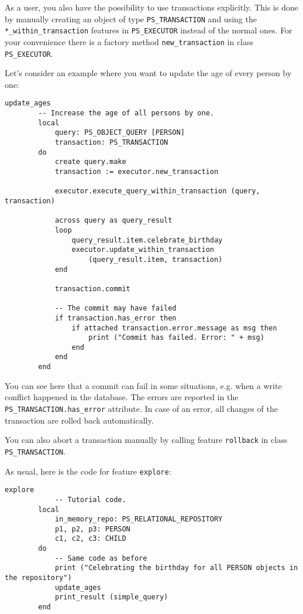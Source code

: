 \documentclass[a4paper,12pt]{report}
\begin{document}
As a user, you also have the possibility to use transactions explicitly. 
This is done by manually creating an object of type \lstinline!PS_TRANSACTION! and using the \lstinline!*_within_transaction! features in \lstinline!PS_EXECUTOR! instead of the normal ones.
For your convenience there is a factory method \lstinline{new_transaction} in class \lstinline!PS_EXECUTOR!.

Let's consider an example where you want to update the age of every person by one:

\begin{lstlisting}[language=OOSC2Eiffel, captionpos=b, caption={}, label={lst:update_all_ages}]
	update_ages
		-- Increase the age of all persons by one.
		local
			query: PS_OBJECT_QUERY [PERSON]
			transaction: PS_TRANSACTION
		do
			create query.make
			transaction := executor.new_transaction

			executor.execute_query_within_transaction (query, transaction)

			across query as query_result
			loop
				query_result.item.celebrate_birthday
				executor.update_within_transaction 
					(query_result.item, transaction)
			end

			transaction.commit

			-- The commit may have failed
			if transaction.has_error then
				if attached transaction.error.message as msg then
					print ("Commit has failed. Error: " + msg)
				end
			end
		end
\end{lstlisting}

You can see here that a commit can fail in some situations, e.g. when a write conflict happened in the database.
The errors are reported in the \lstinline!PS_TRANSACTION.has_error! attribute.
In case of an error, all changes of the transaction are rolled back automatically.

You can also abort a transaction manually by calling feature \lstinline{rollback} in class \lstinline{PS_TRANSACTION}.

As usual, here is the code for feature \lstinline{explore}:
\begin{lstlisting}[language=OOSC2Eiffel, captionpos=b, caption={Testing an update with explicit transaction.}, label={lst:explicit_transactions_update}]
	explore
			-- Tutorial code.
		local
			in_memory_repo: PS_RELATIONAL_REPOSITORY
			p1, p2, p3: PERSON
			c1, c2, c3: CHILD
		do
			-- Same code as before
			print ("Celebrating the birthday for all PERSON objects in the repository")
			update_ages
			print_result (simple_query)
		end
\end{lstlisting}
\end{document}
